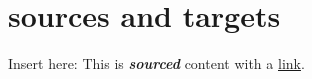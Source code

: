 \section{sources and targets}

Insert here: This is \textbf{\emph{sourced}} content with a \href{https://example.com}{link}.

